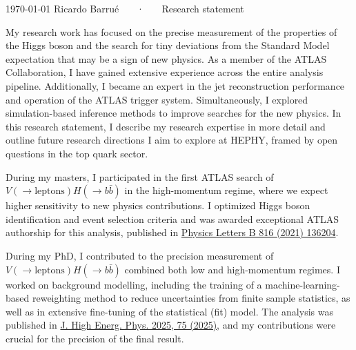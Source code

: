 \documentclass[11pt, a4paper]{awesome-cv}
\begin{document}
\makecvheader[R]

\makecvfooter
  {\today}
  {Ricardo Barrué ~~~·~~~ Research statement}
  {}

\makelettertitle

\begin{cvletter}

  My research work has focused on the precise measurement of the properties of the Higgs boson and the search for tiny deviations from the Standard Model expectation that may be a sign of new physics. As a member of the ATLAS Collaboration, I have gained extensive experience across the entire analysis pipeline. Additionally, I became an expert in the jet reconstruction performance and operation of the ATLAS trigger system. Simultaneously, I explored simulation-based inference methods to improve searches for the new physics. In this research statement, I describe my research expertise in more detail and outline future research directions I aim to explore at HEPHY, framed by open questions in the top quark sector.

  
  During my masters, I participated in the first ATLAS search of $V(\to \textrm{leptons})H(\to b\bar{b})$ in the high-momentum regime, where we expect higher sensitivity to new physics contributions. I optimized Higgs boson identification and event selection criteria and was awarded exceptional ATLAS authorship for this analysis, published in \href{https://doi.org/10.1016/j.physletb.2021.136204}{Physics Letters B 816 (2021) 136204}.
  
  During my PhD, I contributed to the precision measurement of $V(\to \textrm{leptons})H(\to b\bar{b})$ combined both low and high-momentum regimes. I worked on background modelling, including the training of a machine-learning-based reweighting method to reduce uncertainties from finite sample statistics, as well as in extensive fine-tuning of the statistical (fit) model. The analysis was published in \href{https://doi.org/10.1007/JHEP04(2025)075}{J. High Energ. Phys. 2025, 75 (2025)}, and my contributions were crucial for the precision of the final result.
  

\end{cvletter}
\end{document}
